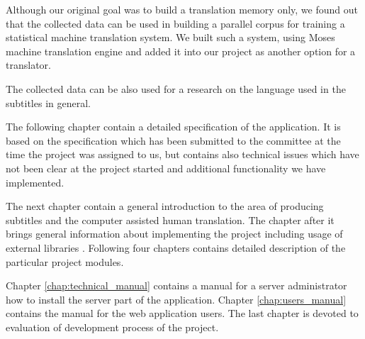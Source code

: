 Although our original goal was to build a translation memory only, we found out that the collected data can be used in building a parallel corpus for training a statistical machine translation system. We built such a system, using Moses machine translation engine and added it into our project as another option for a translator. 

The collected data can be also used for a research on the language used in the subtitles in general.

The following chapter contain a detailed specification of the application. It is based on the specification which has been submitted to the committee at the time the project was assigned to us, but contains also technical issues which have not been clear at the project started and additional functionality we have implemented. 

The next chapter contain a general introduction to the area of producing subtitles and the computer assisted human translation. The chapter after it brings general information about implementing the project including usage of external libraries . Following four chapters contains detailed description of the particular project modules.

Chapter \ref{chap:technical_manual} contains a manual for a server administrator how to install the server part of the application. Chapter \ref{chap:users_manual} contains the manual for the web application users. The last chapter is devoted to evaluation of development process of the project.